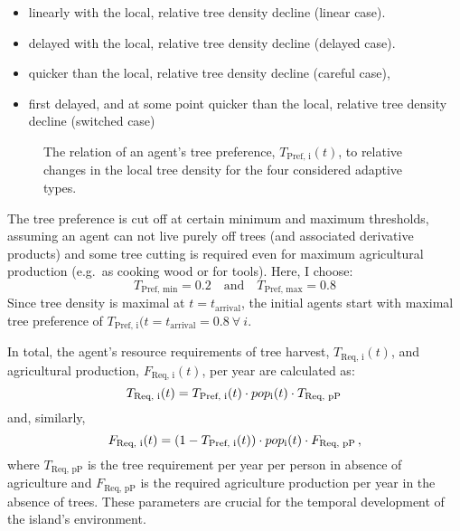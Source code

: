 \begin{itemize}
	\item linearly with the local, relative tree density decline (linear case).  
	\item delayed with the local, relative tree density decline (delayed case).
	\item quicker than the local, relative tree density decline (careful case),
	\item first delayed, and at some point quicker than the local, relative tree density decline (switched case) 
\end{itemize}
\begin{figure}
	\centering
	\caption{The relation of an agent's tree preference, $T_\text{Pref, i}(t)$, to relative changes in the local tree density for the four considered adaptive types.}
	\label{fig:TPref_T}
\end{figure}
The tree preference is cut off at certain minimum and maximum thresholds, assuming an agent can not live purely off trees (and associated derivative products) and some tree cutting is required even for maximum agricultural production (e.g.\ as cooking wood or for tools). 
Here, I choose: 
\begin{equation}
T_\text{Pref, min} = 0.2 \quad \text{and} \quad T_\text{Pref, max} = 0.8
\end{equation} 
Since tree density is maximal at $t=t_\text{arrival}$, the initial agents start with maximal tree preference of $T_\text{Pref, i}(t=t_\text{arrival} = 0.8 \  \forall \ i$.


In total, the agent's resource requirements of tree harvest, $T_\text{Req, i}(t)$, and agricultural production, $F_\text{Req, i}(t)$, per year are calculated as:
\begin{equation}
T_\text{Req, i}(t) = T_\text{Pref, i}(t) \cdot pop_{\rm i}(t) \cdot T_\text{Req, pP} \, 
\end{equation}
and, similarly, 
\begin{equation}
F_\text{Req, i}(t) = (1-T_\text{Pref, i}(t)) \cdot pop_{\rm i}(t) \cdot F_\text{Req, pP}\, , 
\end{equation}
where $T_\text{Req, pP}$ is the tree requirement per year per person in absence of agriculture and $F_\text{Req, pP}$ is the required agriculture production per year in the absence of trees.
These parameters are crucial for the temporal development of the island's environment. 

